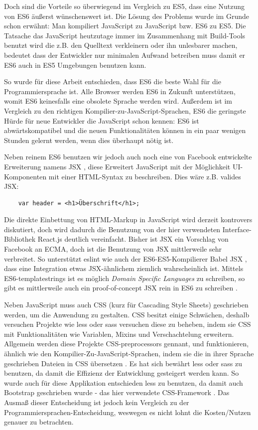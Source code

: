 \documentclass[12pt,twoside]{book}
\begin{document}
Doch sind die Vorteile so überwiegend im Vergleich zu ES5, dass eine Nutzung von ES6 äußerst wünschenswert ist.
Die Lösung des Problems wurde im Grunde schon erwähnt: Man kompiliert JavaScript zu JavaScript bzw. ES6 zu ES5.
Die Tatsache das JavaScript heutzutage immer im Zusammenhang mit Build-Tools benutzt wird die z.B. den Quelltext verkleinern oder ihn unlesbarer machen, bedeutet dass der Entwickler nur minimalen Aufwand betreiben muss damit er ES6 auch in ES5 Umgebungen benutzen kann.

So wurde für diese Arbeit entschieden, dass ES6 die beste Wahl für die Programmiersprache ist. Alle Browser werden ES6 in Zukunft unterstützen, womit ES6 keinesfalls eine obsolete Sprache werden wird. Außerdem ist im Vergleich zu den richtigen Kompilier-zu-JavaScript-Sprachen, ES6 die geringste Hürde für neue Entwickler die JavaScript schon kennen: ES6 ist abwärtskompatibel und die neuen Funktionalitäten können in ein paar wenigen Stunden gelernt werden, wenn dies überhaupt nötig ist.

Neben reinem ES6 benutzen wir jedoch auch noch eine von Facebook entwickelte Erweiterung namens JSX \cite{jsx}, diese Erweitert JavaScript mit der Möglichkeit UI-Komponenten mit einer HTML-Syntax zu beschreiben. Dies wäre z.B. valides JSX:

\begin{verbatim}
    var header = <h1>Überschrift</h1>;
\end{verbatim}

Die direkte Einbettung von HTML-Markup in JavaScript wird derzeit kontrovers diskutiert, doch wird dadurch die Benutzung von der hier verwendeten Interface-Bibliothek React.js deutlich vereinfacht.
Bisher ist JSX ein Vorschlag von Facebook an ECMA, doch ist die Benutzung von JSX mittlerweile sehr verbreitet. So unterstützt eslint \cite{eslint} wie auch der ES6-ES5-Kompilierer Babel JSX \cite{babel}, dass eine Integration etwas JSX-ähnlichem ziemlich wahrscheinlich ist.
Mittels ES6-templatestrings ist es möglich \textit{Domain Specific Languages} zu schreiben, so gibt es mittlerweile auch ein proof-of-concept JSX rein in ES6 zu schreiben \cite{templatestrings}.

Neben JavaScript muss auch CSS (kurz für Cascading Style Sheets) geschrieben werden, um die Anwendung zu gestalten. CSS besitzt einige Schwächen, deshalb versuchen Projekte wie less oder sass versuchen diese zu beheben, indem sie CSS mit Funktionalitäten wie Variablen, Mixins und Verschachtelung erweitern.
Allgemein werden diese Projekte CSS-preprocessors gennant, und funktionieren,
ähnlich wie den Kompilier-Zu-JavaScript-Sprachen, indem sie die in ihrer Sprache geschrieben Dateien in CSS übersetzen \cite{csspre}.
Es hat sich bewährt less oder sass zu benutzen, da damit die Effizienz der Entwicklung gesteigert werden kann. So wurde auch für diese Applikation entschieden less zu benutzen, da damit auch Bootstrap geschrieben wurde - das hier verwendete CSS-Framework \cite{csspre}.
Das Ausmaß dieser Entscheidung ist jedoch kein Vergleich zu der Programmiersprachen-Entscheidung, weswegen es nicht lohnt die Kosten/Nutzen genauer zu betrachten.
\end{document}
